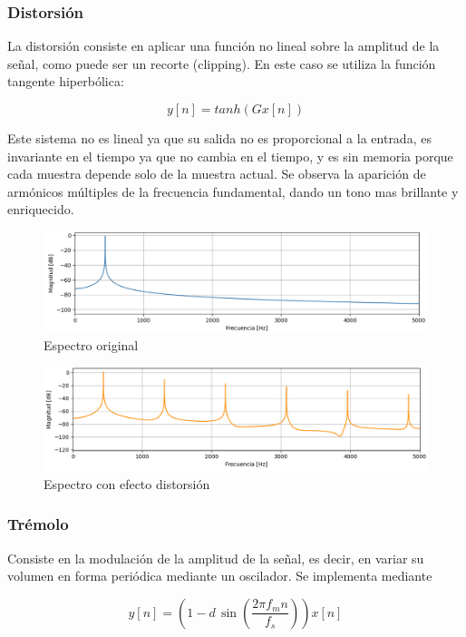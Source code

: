\documentclass[12pt]{article}
\begin{document}
\subsubsection{Distorsión}

La distorsión consiste en aplicar una función no lineal sobre la amplitud de la señal, como puede ser un recorte (clipping). En este caso se utiliza la función tangente hiperbólica:

\[
y[n] = tanh(Gx[n])
\]

Este sistema no es lineal ya que su salida no es proporcional a la entrada, es invariante en el tiempo ya que no cambia en el tiempo, y es sin memoria porque cada muestra depende solo de la muestra actual.
Se observa la aparición de armónicos múltiples de la frecuencia fundamental, dando un tono mas brillante y enriquecido.

\begin{figure}[H]
    \centering
    \includegraphics[width=0.75\linewidth]{plot/distorsion_original.png}
    \caption{Espectro original}
    \label{distorsion_original}
\end{figure}

\begin{figure}[H]
    \centering
    \includegraphics[width=0.75\linewidth]{plot/distorsion_efecto.png}
    \caption{Espectro con efecto distorsión}
    \label{distorsion_efecto}
\end{figure}

\subsubsection{Trémolo}

Consiste en la modulación de la amplitud de la señal, es decir, en variar su volumen en forma periódica mediante un oscilador. Se implementa mediante

\[
y[n] = \left( 1 - d \, \sin\left( \frac{2\pi f_m n}{f_s} \right) \right) x[n]
\]
\end{document}
